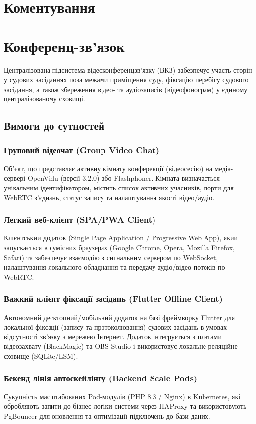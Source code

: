 \documentclass{article}
\begin{document}
\section{Коментування}
\section{Конференц-зв'язок}
Централізована підсистема відеоконференцзв’язку (ВКЗ) забезпечує участь сторін у судових засіданнях поза межами приміщення суду, фіксацію перебігу судового засідання, а також збереження відео- та аудіозаписів (відеофонограм) у єдиному централізованому сховищі.

\subsection{Вимоги до сутностей}

\subsubsection{Груповий відеочат (Group Video Chat)}
Об'єкт, що представляє активну кімнату конференції (відеосесію) на медіа-сервері OpenVidu (версії 3.2.0) або Flashphoner. Кімната визначається унікальним ідентифікатором, містить список активних учасників, порти для WebRTC з'єднань, статус запису та налаштування якості відео/аудіо.

\subsubsection{Легкий веб-клієнт (SPA/PWA Client)}
Клієнтський додаток (Single Page Application / Progressive Web App), який запускається в сумісних браузерах (Google Chrome, Opera, Mozilla Firefox, Safari) та забезпечує взаємодію з сигнальним сервером по WebSocket, налаштування локального обладнання та передачу аудіо/відео потоків по WebRTC.

\subsubsection{Важкий клієнт фіксації засідань (Flutter Offline Client)}
Автономний десктопний/мобільний додаток на базі фреймворку Flutter для локальної фіксації (запису та протоколювання) судових засідань в умовах відсутності зв’язку з мережею Інтернет. Додаток інтегрується з платами відеозахвату (BlackMagic) та OBS Studio і використовує локальне реляційне сховище (SQLite/LSM).

\subsubsection{Бекенд лінія автоскейлінгу (Backend Scale Pods)}
Сукупність масштабованих Pod-модулів (PHP 8.3 / Nginx) в Kubernetes, які обробляють запити до бізнес-логіки системи через HAProxy та використовують PgBouncer для оновлення та оптимізації підключень до бази даних.
\end{document}
